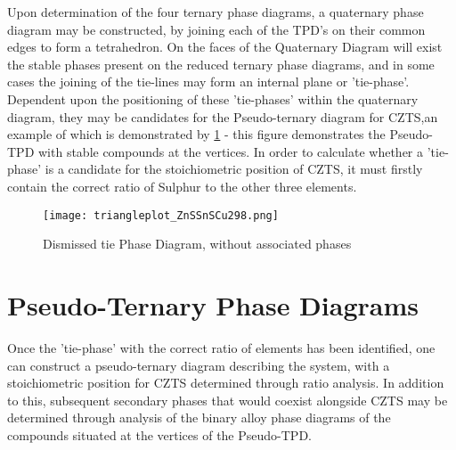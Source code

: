 Upon determination of the four ternary phase diagrams, a quaternary phase diagram may be constructed, by joining each of the TPD's on their common edges to form a tetrahedron. On the faces of the Quaternary Diagram will exist the stable phases present on the reduced ternary phase diagrams, and in some cases the joining of the tie-lines may form an internal plane or 'tie-phase'. Dependent upon the positioning of these 'tie-phases' within the quaternary diagram, they may be candidates for the Pseudo-ternary diagram for CZTS,an example of which is demonstrated by \ref{fig:ZnSSnSCu} - this figure demonstrates the Pseudo-TPD with stable compounds at the vertices. In order to calculate whether a 'tie-phase' is a candidate for the stoichiometric position of CZTS, it must firstly contain the correct ratio of Sulphur to the other three elements. 

\begin{figure}[ht]
\centering
    \texttt{[image: triangleplot\_ZnSSnSCu298.png]}
\caption{Dismissed tie Phase Diagram, without associated phases}
\label{fig:ZnSSnSCu}
\end{figure}



\section{Pseudo-Ternary Phase Diagrams}

Once the 'tie-phase' with the correct ratio of elements has been identified, one can construct a pseudo-ternary diagram describing the system, with a stoichiometric position for CZTS determined through ratio analysis. In addition to this, subsequent secondary phases that would coexist alongside CZTS may be determined through analysis of the binary alloy phase diagrams of the compounds situated at the vertices of the Pseudo-TPD.

